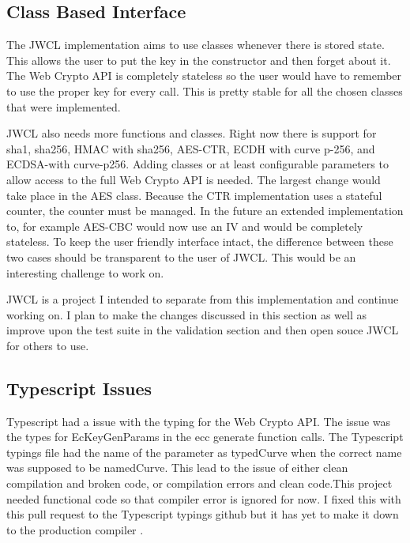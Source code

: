 \subsection{Class Based Interface}


The JWCL implementation aims to use classes whenever there is stored state. This allows the user to put the key in the constructor and then forget about it. The Web Crypto API is completely stateless so the user would have to remember to use the proper key for every call. This is pretty stable for all the chosen classes that were implemented.


JWCL also needs more functions and classes. Right now there is support for sha1, sha256, HMAC with sha256, AES-CTR, ECDH with curve p-256, and ECDSA-with curve-p256. Adding classes or at least configurable parameters to allow access to the full Web Crypto API is needed. The largest change would take place in the AES class. Because the CTR implementation uses a stateful counter, the counter must be managed. In the future an extended implementation to, for example AES-CBC would now use an IV and would be completely stateless. To keep the user friendly interface intact, the difference between these two cases should be transparent to the user of JWCL. This would be an interesting challenge to work on. 


JWCL is a project I intended to separate from this implementation and continue working on. I plan to make the changes discussed in this section as well as improve upon the test suite in the validation section and then open souce JWCL for others to use.


\subsection{Typescript Issues}


Typescript had a issue with the typing for the Web Crypto API. The issue was the types for EcKeyGenParams in the ecc generate function calls. The Typescript typings file had the name of the parameter as typedCurve when the correct name was supposed to be namedCurve. This lead to the issue of either clean compilation and broken code, or compilation errors and clean code.This project needed functional code so that compiler error is ignored for now. I fixed this with this pull request to the Typescript typings github but it has yet to make it down to the production compiler \cite{ts-pull}. 



